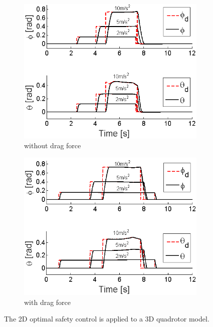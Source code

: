 \documentclass[journal,11pt,onecolumn,draftclsnofoot,]{IEEEtran}
\begin{document}
\begin{figure}
    \centering
    \begin{subfigure}{.48\columnwidth}
        \centering
        \includegraphics[width=\columnwidth]{roll_pitch_avoidance}
        \caption{without drag force}
        \label{fig:roll_pitch_avoidance_frictionless}
    \end{subfigure}
    \hfill
    \begin{subfigure}{.48\columnwidth}
        \centering
        \includegraphics[width=\columnwidth]{roll_pitch_avoidance_friction}
        \caption{with drag force}
        \label{fig:roll_pitch_avoidance_friction}
    \end{subfigure}
    \caption{The 
    2D optimal safety control is applied to a 3D quadrotor model.}
    \label{fig:roll_pitch_avoidance}
\end{figure}
\end{document}
